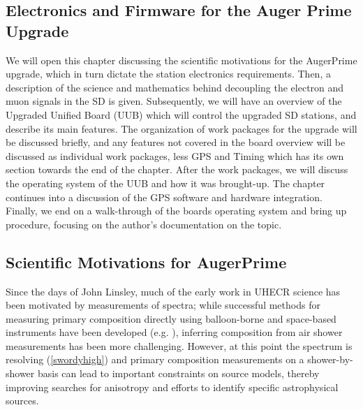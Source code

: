\begin{singlespace}
\chapter{Electronics and Firmware for the Auger Prime Upgrade}
\end{singlespace}
\label{electronics}
We will open this chapter discussing the scientific motivations for the AugerPrime upgrade, which in turn dictate the station electronics requirements. Then, a description of the science and mathematics behind decoupling the electron and muon signals in the SD is given. Subsequently, we will have an overview of the Upgraded Unified Board (UUB) which will control the upgraded SD stations, and describe its main features. The organization of work packages for the upgrade will be discussed briefly, and any features not covered in the board overview will be discussed as individual work packages, less GPS and Timing which has its own section towards the end of the chapter. After the work packages, we will discuss the operating system of the UUB and how it was brought-up. The chapter continues into a discussion of the GPS software and hardware integration. Finally, we end on a walk-through of the boards operating system and bring up procedure, focusing on the author's documentation on the topic. %
\section{Scientific Motivations for AugerPrime}
\label{scimotiv}
Since the days of John Linsley, much of the early work in UHECR science has been motivated by measurements of spectra;
while successful methods for measuring primary composition directly using balloon-borne and space-based instruments have been developed (e.g. ), inferring composition from air shower measurements has been more challenging. 
However, at this point the spectrum is resolving (\autoref{swordyhigh}) and primary composition measurements on a shower-by-shower basis can lead to important constraints on source models, thereby improving searches for anisotropy and efforts to identify specific astrophysical sources.

